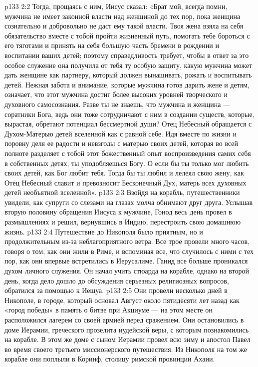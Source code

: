\vs p133 2:2 Тогда, прощаясь с ним, Иисус сказал: «Брат мой, всегда помни, мужчина не имеет законной власти над женщиной до тех пор, пока женщина сознательно и добровольно не даст ему такой власти. Твоя жена взяла на себя обязательство вместе с тобой пройти жизненный путь, помогать тебе бороться с его тяготами и принять на себя большую часть бремени в рождении и воспитании ваших детей; поэтому справедливость требует, чтобы в ответ за это особое служение она получила от тебя ту особую защиту, какую мужчина может дать женщине как партнеру, который должен вынашивать, рожать и воспитывать детей. Нежная забота и внимание, которые мужчина готов дарить жене и детям, означает, что этот мужчина достиг более высоких уровней творческого и духовного самосознания. Разве ты не знаешь, что мужчина и женщина --- соратники Бога, ведь они тоже сотрудничают с ним в создании существ, которые, вырастая, обретают потенциал бессмертной души? Отец Небесный обращается с Духом\hyp{}Матерью детей вселенной как с равной себе. Идя вместе по жизни и поровну деля ее радости и невзгоды с матерью своих детей, которая во всей полноте разделяет с тобой этот божественный опыт воспроизведения самих себя в собственных детях, ты уподобляешься Богу. О если бы ты только мог любить своих детей, как Бог любит тебя. Тогда бы ты любил и лелеял свою жену, как Отец Небесный славит и превозносит Бесконечный Дух, матерь всех духовных детей необъятной вселенной».
\vs p133 2:3 Взойдя на корабль, путешественники увидели, как супруги со слезами на глазах молча обнимают друг друга. Услышав вторую половину обращения Иисуса к мужчине, Гонод весь день провел в размышлениях и решил, вернувшись в Индию, перестроить свою домашнюю жизнь.
\vs p133 2:4 Путешествие до Никополя было приятным, но и продолжительным из\hyp{}за неблагоприятного ветра. Все трое провели много часов, говоря о том, как они жили в Риме, и вспоминая все, что случилось с ними с тех пор, как они впервые встретились в Иерусалиме. Ганид все больше проникался духом личного служения. Он начал учить стюарда на корабле, однако на второй день, когда дело дошло до обсуждения серьезных религиозных вопросов, обратился за помощью к Иешуа.
\vs p133 2:5 Они провели несколько дней в Никополе, в городе, который основал Август около пятидесяти лет назад как «город победы» в память о битве при Акциуме --- на этом месте он расположился лагерем со своей армией перед сражением. Они остановились в доме Иерамии, греческого прозелита иудейской веры, с которым познакомились на корабле. В этом же доме с сыном Иерамии провел всю зиму и апостол Павел во время своего третьего миссионерского путешествия. Из Никополя на том же корабле они поплыли в Коринф, столицу римской провинции Ахаии.
